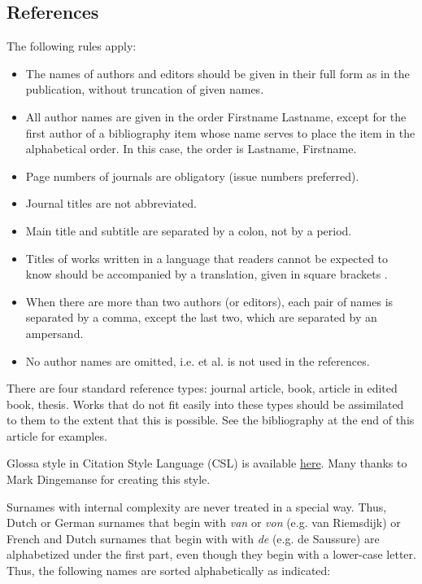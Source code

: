 \documentclass[charis,linguex]{glossa}
\begin{document}
\subsection{References}

The following rules apply:

\begin{itemize}
\item The names of authors and editors should be given in their full form as in the publication, without truncation of given names.
\item All author names are given in the order Firstname Lastname, except for the first author of a bibliography item whose name serves to place the item in the alphabetical order. In this case, the order is Lastname, Firstname.
\item Page numbers of journals are obligatory (issue numbers preferred).
\item Journal titles are not abbreviated.
\item Main title and subtitle are separated by a colon, not by a period.
\item Titles of works written in a language that readers cannot be expected to know should be accompanied by a translation, given in square brackets \citep{Li1999}.
\item When there are more than two authors (or editors), each pair of names is separated by a comma, except the last two, which are separated by an ampersand. 
\item No author names are omitted, i.e. et al. is not used in the references.
\end{itemize}

There are four standard reference types: journal article, book, article in edited book, thesis. Works that do not fit easily into these types should be assimilated to them to the extent that this is possible. See the bibliography at the end of this article for examples.

Glossa style in Citation Style Language (CSL) is available \href{https://www.zotero.org/styles?q=Glossa}{here}. Many thanks to Mark Dingemanse for creating this style.

Surnames with internal complexity are never treated in a special way. Thus, Dutch or German surnames that begin with \textit{van} or \textit{von} (e.g. van Riemsdijk) or French and Dutch surnames that begin with with \textit{de} (e.g. de Saussure) are alphabetized under the first part, even though they begin with a lower-case letter. Thus, the following names are sorted alphabetically as indicated:
\end{document}

